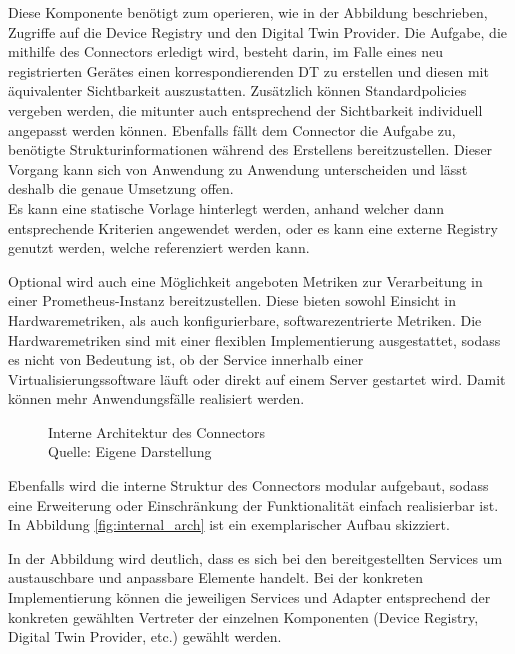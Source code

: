 Diese Komponente benötigt zum operieren, wie in der Abbildung beschrieben, Zugriffe auf die Device Registry und den Digital Twin Provider. Die Aufgabe, die mithilfe des Connectors erledigt wird, besteht darin, im Falle eines neu registrierten Gerätes einen korrespondierenden \ac{DT} zu erstellen und diesen mit äquivalenter Sichtbarkeit auszustatten. Zusätzlich können Standardpolicies vergeben werden, die mitunter auch entsprechend der Sichtbarkeit individuell angepasst werden können. Ebenfalls fällt dem Connector die Aufgabe zu, benötigte Strukturinformationen während des Erstellens bereitzustellen. Dieser Vorgang kann sich von Anwendung zu Anwendung unterscheiden und lässt deshalb die genaue Umsetzung offen.\\
Es kann eine statische Vorlage hinterlegt werden, anhand welcher dann entsprechende Kriterien angewendet werden, oder es kann eine externe Registry genutzt werden, welche referenziert werden kann.

Optional wird auch eine Möglichkeit angeboten Metriken zur Verarbeitung in einer Prometheus-Instanz bereitzustellen. Diese bieten sowohl Einsicht in Hardwaremetriken, als auch konfigurierbare, softwarezentrierte Metriken. Die Hardwaremetriken sind mit einer flexiblen Implementierung ausgestattet, sodass es nicht von Bedeutung ist, ob der Service innerhalb einer Virtualisierungssoftware läuft oder direkt auf einem Server gestartet wird. Damit können mehr Anwendungsfälle realisiert werden.

\begin{figure}
    \centering
    \caption{Interne Architektur des Connectors\\Quelle: Eigene Darstellung}
    \label{fig:internal_arch}
\end{figure}
Ebenfalls wird die interne Struktur des Connectors modular aufgebaut, sodass eine Erweiterung oder Einschränkung der Funktionalität einfach realisierbar ist. In Abbildung \vref{fig:internal_arch} ist ein exemplarischer Aufbau skizziert.

In der Abbildung wird deutlich, dass es sich bei den bereitgestellten Services um austauschbare und anpassbare Elemente handelt. Bei der konkreten Implementierung können die jeweiligen Services und Adapter entsprechend der konkreten gewählten Vertreter der einzelnen Komponenten (Device Registry, Digital Twin Provider, etc.) gewählt werden.

